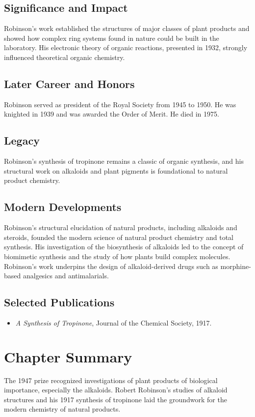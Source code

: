 \subsection*{Significance and Impact}

Robinson's work established the structures of major classes of plant products and showed how complex ring systems found in nature could be built in the laboratory. His electronic theory of organic reactions, presented in 1932, strongly influenced theoretical organic chemistry.

\subsection*{Later Career and Honors}

Robinson served as president of the Royal Society from 1945 to 1950. He was knighted in 1939 and was awarded the Order of Merit. He died in 1975.

\subsection*{Legacy}

Robinson's synthesis of tropinone remains a classic of organic synthesis, and his structural work on alkaloids and plant pigments is foundational to natural product chemistry.

\subsection*{Modern Developments}

Robinson's structural elucidation of natural products, including alkaloids and steroids, founded the modern science of natural product chemistry and total synthesis. His investigation of the biosynthesis of alkaloids led to the concept of biomimetic synthesis and the study of how plants build complex molecules. Robinson's work underpins the design of alkaloid-derived drugs such as morphine-based analgesics and antimalarials.

\subsection*{Selected Publications}

\begin{itemize}

\item \emph{A Synthesis of Tropinone}, Journal of the Chemical Society, 1917.

\end{itemize}

\clearpage

\section*{Chapter Summary}

The 1947 prize recognized investigations of plant products of biological importance, especially the alkaloids. Robert Robinson's studies of alkaloid structures and his 1917 synthesis of tropinone laid the groundwork for the modern chemistry of natural products.
